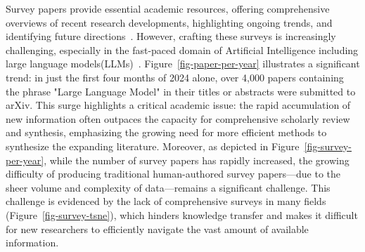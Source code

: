 Survey papers provide essential academic resources, offering comprehensive overviews of recent research developments, highlighting ongoing trends, and identifying future directions~\cite{pouyanfar2018survey,chang2023survey,zhao2023survey,khan2022transformers}. However, crafting these surveys is increasingly challenging, especially in the fast-paced domain of Artificial Intelligence including large language models(LLMs)~\cite{lecun2015deep,goodfellow2016deep,achiam2023gpt,kirillov2023segment}. Figure~\ref{fig-paper-per-year} illustrates a significant trend: in just the first four months of 2024 alone, over 4,000 papers containing the phrase "Large Language Model" in their titles or abstracts were submitted to arXiv. This surge highlights a critical academic issue: the rapid accumulation of new information often outpaces the capacity for comprehensive scholarly review and synthesis, emphasizing the growing need for more efficient methods to synthesize the expanding literature. Moreover, as depicted in Figure~\ref{fig-survey-per-year}, while the number of survey papers has rapidly increased, the growing difficulty of producing traditional human-authored survey papers—due to the sheer volume and complexity of data—remains a significant challenge. This challenge is evidenced by the lack of comprehensive surveys in many fields (Figure~\ref{fig-survey-tsne}), which hinders knowledge transfer and makes it difficult for new researchers to efficiently navigate the vast amount of available information.

